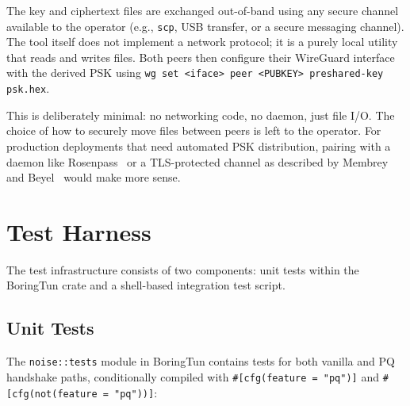 The key and ciphertext files are exchanged out-of-band using any secure channel available to the operator (e.g., \texttt{scp}, USB transfer, or a secure messaging channel). The tool itself does not implement a network protocol; it is a purely local utility that reads and writes files. Both peers then configure their WireGuard interface with the derived PSK using \texttt{wg set <iface> peer <PUBKEY> preshared-key psk.hex}.

This is deliberately minimal: no networking code, no daemon, just file I/O. The choice of how to securely move files between peers is left to the operator. For production deployments that need automated PSK distribution, pairing with a daemon like Rosenpass~\cite{rosenpass} or a TLS-protected channel as described by Membrey and Beyel~\cite{membrey2025expressvpn} would make more sense.

\section{Test Harness}

The test infrastructure consists of two components: unit tests within the BoringTun crate and a shell-based integration test script.

\subsection{Unit Tests}

The \texttt{noise::tests} module in BoringTun contains tests for both vanilla and PQ handshake paths, conditionally compiled with \texttt{\#[cfg(feature = "pq")]} and \texttt{\#[cfg(not(feature = "pq"))]}:


